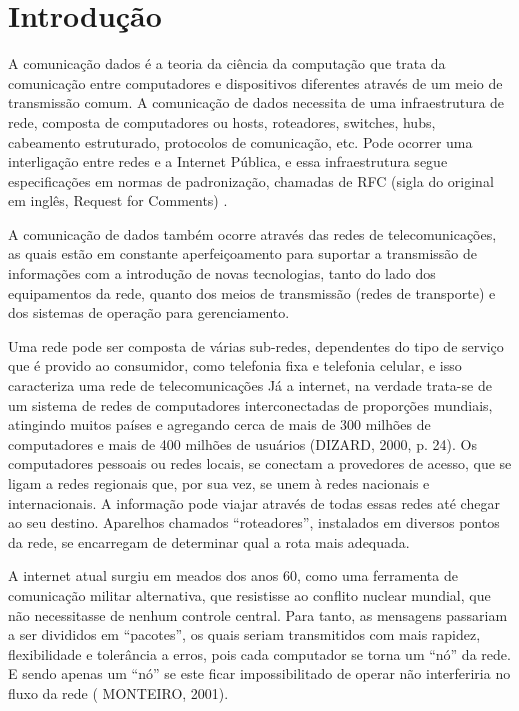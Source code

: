 \section{Introdução}
	A comunicação dados é a teoria da ciência da computação que trata da comunicação entre computadores e dispositivos diferentes através de um meio de transmissão comum.  A comunicação de dados necessita de uma infraestrutura de rede, composta de computadores ou hosts, roteadores, switches, hubs, cabeamento estruturado, protocolos de comunicação, etc. Pode ocorrer uma interligação entre redes e a Internet Pública,  e essa infraestrutura segue especificações em normas de padronização, chamadas de RFC (sigla do original em inglês, Request for Comments) \cite{napsol2010}.
	
	A comunicação de dados também ocorre através das redes de telecomunicações, as quais estão em constante aperfeiçoamento para suportar a transmissão de informações com a introdução de novas tecnologias, tanto do lado dos equipamentos da rede, quanto dos meios de transmissão (redes de transporte) e dos sistemas de operação para gerenciamento. 
	
	Uma rede pode ser composta de várias sub-redes, dependentes do tipo de serviço que é provido ao consumidor, como telefonia fixa e  telefonia celular, e isso caracteriza uma rede de telecomunicações 
	Já a internet, na verdade  trata-se de um sistema de redes de computadores interconectadas de proporções mundiais, atingindo muitos países e agregando cerca de mais de 300 milhões de computadores e mais de 400 milhões de usuários (DIZARD, 2000, p. 24). Os computadores pessoais ou redes locais, se conectam a provedores de acesso, que se ligam a redes regionais que, por sua vez, se unem à redes nacionais e internacionais. A informação pode viajar através de todas essas redes até chegar ao seu destino. Aparelhos chamados “roteadores”, instalados em diversos pontos da rede, se encarregam de determinar qual a rota mais adequada.
	
	A internet atual surgiu em meados dos anos 60, como uma ferramenta de comunicação militar alternativa, que resistisse ao conflito nuclear mundial, que não necessitasse de nenhum controle central. Para tanto, as mensagens passariam a ser divididos em “pacotes”, os quais seriam transmitidos com mais rapidez, flexibilidade e tolerância a erros, pois cada computador se torna um “nó” da rede. E sendo apenas um “nó” se este ficar impossibilitado de operar não interferiria no fluxo da rede ( MONTEIRO, 2001).
	
